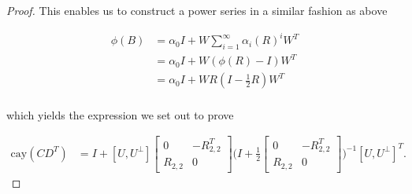 \documentclass[11pt,a4paper,english]{elsarticle}%
\begin{document}
\begin{proof}
This enables us to construct a power series in a similar fashion as above

\begin{align*}
    \phi(B) &= \alpha_0 I + W \sum_{i=1}^{\infty}\alpha_i (R)^{i}W^T \\
     &= \alpha_0 I + W (\phi(R) - I)W^T \\
     &= \alpha_0 I + W R(I-\frac{1}{2}R)W^T \\
\end{align*}

\noindent which yields the expression we set out to prove

\begin{align*}
    \text{cay}(CD^T) &= I + [U,U^{\perp}]\begin{bmatrix}
      0&-R^T_{2,2}\\
      R_{2,2}&0
    \end{bmatrix}
    \biggl(I+\frac{1}{2}
    \begin{bmatrix}
      0&-R^T_{2,2}\\
      R_{2,2}&0
    \end{bmatrix}
    \biggl)^{-1}[U,U^{\perp}]^T.
  \end{align*}

\end{proof}


\end{document}
